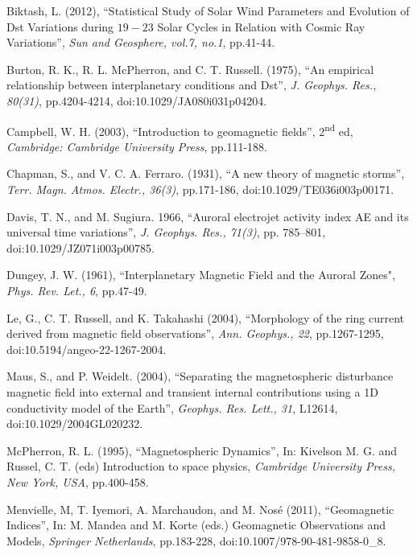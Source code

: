 \documentclass[12pt]{report} %
\begin{document}
\begin{thebibliography}{9}

 Biktash, L. (2012), ``Statistical Study of Solar Wind Parameters and Evolution of Dst Variations during $19-23$ Solar Cycles in Relation with Cosmic Ray Variations'', \textit{Sun and Geosphere, vol.7, no.1}, pp.41-44.

Burton, R. K., R. L. McPherron, and C. T. Russell. (1975), ``An empirical relationship between interplanetary conditions and Dst'', \textit{J. Geophys. Res., 80(31)}, pp.4204-4214, doi:10.1029/JA080i031p04204.

 Campbell, W. H. (2003), ``Introduction to geomagnetic fields'', 2\textsuperscript{nd} ed, \textit{Cambridge: Cambridge University Press}, pp.111-188.

 Chapman, S., and V. C. A. Ferraro. (1931), ``A new theory of magnetic storms'', \textit{Terr. Magn. Atmos. Electr., 36(3)}, pp.171-186, doi:10.1029/TE036i003p00171.

 Davis, T. N., and M. Sugiura. 1966, ``Auroral electrojet activity index AE and its universal time variations'', \textit{J. Geophys. Res., 71(3)}, pp. 785–801, doi:10.1029/JZ071i003p00785.

 Dungey, J. W. (1961), ``Interplanetary Magnetic Field and the Auroral Zones", \textit{Phys. Rev. Let., 6}, pp.47-49.

Le, G., C. T. Russell, and K. Takahashi (2004), ``Morphology of the ring current derived from magnetic field observations'', \textit{Ann. Geophys., 22}, pp.1267-1295, doi:10.5194/angeo-22-1267-2004.

 Maus, S., and P. Weidelt. (2004), ``Separating the magnetospheric disturbance magnetic field into external and transient internal contributions using a 1D conductivity model of the Earth'', \textit{Geophys. Res. Lett., 31}, L12614, doi:10.1029/2004GL020232.

 McPherron, R. L. (1995), ``Magnetospheric Dynamics'', In: Kivelson M. G. and Russel, C. T. (eds) Introduction to space physics, \textit{Cambridge University Press, New York, USA}, pp.400-458.

Menvielle, M, T. Iyemori, A. Marchaudon, and M. Nosé (2011), ``Geomagnetic Indices'', In: M. Mandea and M. Korte (eds.) Geomagnetic Observations and Models, \textit{Springer Netherlands}, pp.183-228, doi:10.1007/978-90-481-9858-0\_8.


\end{thebibliography}
\end{document}
